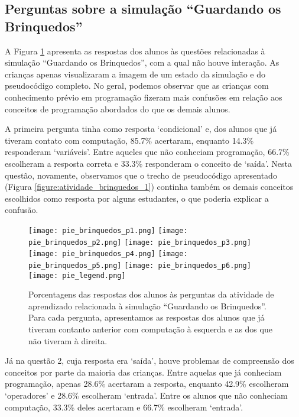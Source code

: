 \subsection{Perguntas sobre a simulação \enquote{Guardando os Brinquedos}}

A Figura \ref{figure:pies_brinquedos} apresenta as respostas dos alunos às questões relacionadas à simulação \enquote{Guardando os Brinquedos}, com a qual não houve interação. As crianças apenas visualizaram a imagem de um estado da simulação e do pseudocódigo completo. No geral, podemos observar que as crianças com conhecimento prévio em programação fizeram mais confusões em relação aos conceitos de programação abordados do que os demais alunos.

A primeira pergunta tinha como resposta \enquote*{condicional} e, dos alunos que já tiveram contato com computação, 85.7\% acertaram, enquanto 14.3\% responderam \enquote*{variáveis}. Entre aqueles que não conheciam programação, 66.7\% escolheram a resposta correta e 33.3\% responderam o conceito de \enquote*{saída}. Nesta questão, novamente, observamos que o trecho de pseudocódigo apresentado (Figura \ref{figure:atividade_brinquedos_1}) continha também os demais conceitos escolhidos como resposta por alguns estudantes, o que poderia explicar a confusão.

\begin{figure}[h!]
    \centering
    \texttt{[image: pie\_brinquedos\_p1.png]}
    \texttt{[image: pie\_brinquedos\_p2.png]}
    \texttt{[image: pie\_brinquedos\_p3.png]}
    \texttt{[image: pie\_brinquedos\_p4.png]}
    \texttt{[image: pie\_brinquedos\_p5.png]}
    \texttt{[image: pie\_brinquedos\_p6.png]}
    \texttt{[image: pie\_legend.png]}
    \caption{Porcentagens das respostas dos alunos às perguntas da atividade de aprendizado relacionada à simulação \enquote{Guardando os Brinquedos}. Para cada pergunta, apresentamos as respostas dos alunos que já tiveram contanto anterior com computação à esquerda e as dos que não tiveram à direita.}
    \label{figure:pies_brinquedos}
\end{figure}

Já na questão 2, cuja resposta era \enquote*{saída}, houve problemas de compreensão dos conceitos por parte da maioria das crianças. Entre aquelas que já conheciam programação, apenas 28.6\% acertaram a resposta, enquanto 42.9\% escolheram \enquote*{operadores} e 28.6\% escolheram \enquote*{entrada}. Entre os alunos que não conheciam computação, 33.3\% deles acertaram e 66.7\% escolheram \enquote*{entrada}.

